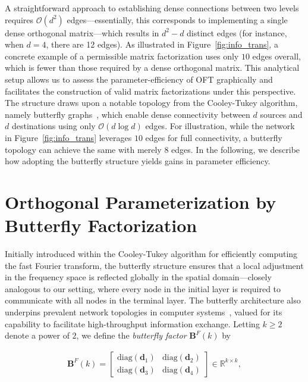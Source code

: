 A straightforward approach to establishing dense connections between two levels requires $\mathcal{O}(d^2)$ edges—essentially, this corresponds to implementing a single dense orthogonal matrix—which results in $d^2-d$ distinct edges (for instance, when $d=4$, there are 12 edges). As illustrated in Figure~\ref{fig:info_trans}, a concrete example of a permissible matrix factorization uses only $10$ edges overall, which is fewer than those required by a dense orthogonal matrix. This analytical setup allows us to assess the parameter-efficiency of OFT graphically and facilitates the construction of valid matrix factorizations under this perspective. The structure draws upon a notable topology from the Cooley-Tukey algorithm, namely butterfly graphs~\cite{cooley1965algorithm}, which enable dense connectivity between $d$ sources and $d$ destinations using only $\mathcal{O}(d\log d)$ edges. For illustration, while the network in Figure~\ref{fig:info_trans} leverages $10$ edges for full connectivity, a butterfly topology can achieve the same with merely $8$ edges. In the following, we describe how adopting the butterfly structure yields gains in parameter efficiency.

\section{Orthogonal Parameterization by Butterfly Factorization}

Initially introduced within the Cooley-Tukey algorithm for efficiently computing the fast Fourier transform, the butterfly structure ensures that a local adjustment in the frequency space is reflected globally in the spatial domain—closely analogous to our setting, where every node in the initial layer is required to communicate with all nodes in the terminal layer. The butterfly architecture also underpins prevalent network topologies in computer systems~\cite{solihin2015fundamentals,li2011linear}, valued for its capability to facilitate high-throughput information exchange. Letting $k\geq 2$ denote a power of $2$, we define the \emph{butterfly factor} $\bm{B}^F(k)$ by

\begin{equation}\label{eq:but_factor}
\begin{aligned}
    \bm{B}^F(k)=\begin{bmatrix}
    \text{diag}(\bm{d}_1) & \text{diag}(\bm{d}_2) \\
    \text{diag}(\bm{d}_3) & \text{diag}(\bm{d}_4)
    \end{bmatrix}\in\mathbb{R}^{k\times k},
\end{aligned}
\end{equation}

